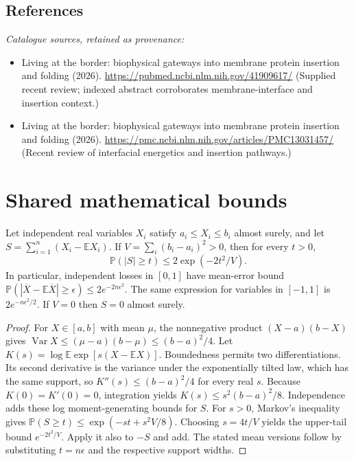 \documentclass[11pt]{article}
\begin{document}
\subsection{References}
\noindent\emph{Catalogue sources, retained as provenance:}
\begin{itemize}
\item Living at the border: biophysical gateways into membrane protein insertion and folding (2026). \url{https://pubmed.ncbi.nlm.nih.gov/41909617/} (Supplied recent review; indexed abstract corroborates membrane-interface and insertion context.)
\item Living at the border: biophysical gateways into membrane protein insertion and folding (2026). \url{https://pmc.ncbi.nlm.nih.gov/articles/PMC13031457/} (Recent review of interfacial energetics and insertion pathways.)
\end{itemize}




\section{Shared mathematical bounds}\label{app:bounds}
\begin{lemma}\label{lem:bounded}
Let independent real variables $X_i$ satisfy $a_i\leq X_i\leq b_i$ almost surely,
and let $S=\sum_{i=1}^n(X_i-\mathbb{E} X_i)$. If
$V=\sum_i(b_i-a_i)^2>0$, then for every $t>0$,
\[
 \mathbb{P}(|S|\geq t)\leq 2\exp(-2t^2/V).
\]
In particular, independent losses in $[0,1]$ have mean-error bound
$\mathbb{P}(|\overline X-\mathbb{E}\overline X|\geq\epsilon)
\leq2e^{-2n\epsilon^2}$. The same expression for variables in $[-1,1]$
is $2e^{-n\epsilon^2/2}$. If $V=0$ then $S=0$ almost surely.
\end{lemma}
\begin{proof}
For $X\in[a,b]$ with mean $\mu$, the nonnegative product
$(X-a)(b-X)$ gives
$\operatorname{Var} X\leq(\mu-a)(b-\mu)\leq(b-a)^2/4$.
Let $K(s)=\log\mathbb{E}\exp[s(X-\mathbb{E} X)]$.
Boundedness permits two differentiations. Its second derivative is the variance
under the exponentially tilted law, which has the same support, so
$K''(s)\leq(b-a)^2/4$ for every real $s$.
Because $K(0)=K'(0)=0$, integration yields
$K(s)\leq s^2(b-a)^2/8$.
Independence adds these log moment-generating bounds for $S$.
For $s>0$, Markov's inequality gives
$\mathbb{P}(S\geq t)\leq\exp(-st+s^2V/8)$.
Choosing $s=4t/V$ yields the upper-tail bound $e^{-2t^2/V}$.
Apply it also to $-S$ and add. The stated mean versions follow by substituting
$t=n\epsilon$ and the respective support widths.
\end{proof}
\end{document}
